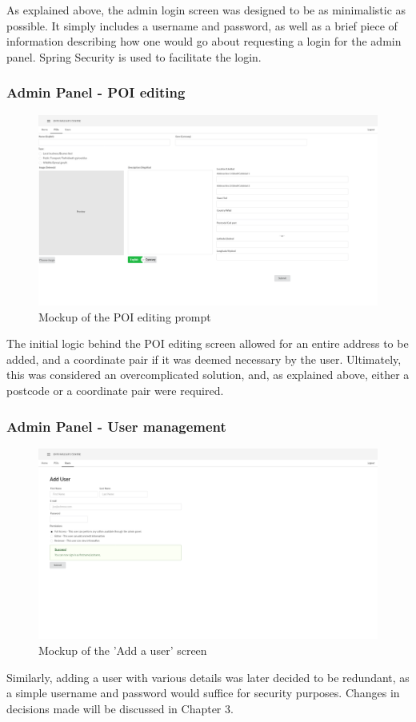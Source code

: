As explained above, the admin login screen was designed to be as minimalistic as possible. It simply includes a username and password, as well as a brief piece of information describing how one would go about requesting a login for the admin panel. Spring Security is used to facilitate the login.

\subsubsection{Admin Panel - POI editing}
\begin{figure}[H]
\includegraphics[scale=0.2]{mockups/Admin Panel - POIs (not filled, English)}
\caption{Mockup of the POI editing prompt}
\end{figure}

The initial logic behind the POI editing screen allowed for an entire address to be added, and a coordinate pair if it was deemed necessary by the user. Ultimately, this was considered an overcomplicated solution, and, as explained above, either a postcode or a coordinate pair were required.
\newpage
\subsubsection{Admin Panel - User management}
\begin{figure}[H]
\includegraphics[scale=0.2]{mockups/Admin Panel - Add User}
\caption{Mockup of the 'Add a user' screen}
\end{figure}

Similarly, adding a user with various details was later decided to be redundant, as a simple username and password would suffice for security purposes. Changes in decisions made will be discussed in Chapter 3.

